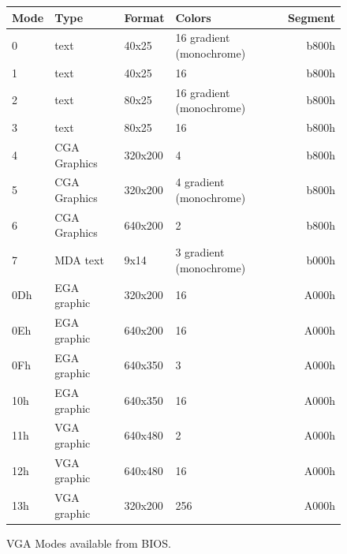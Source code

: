 \documentclass[book.tex]{subfiles}
\begin{document}
\begin{figure}[H]
\centering
\begin{table}[H]
\begin{tabularx}{\textwidth}[c]{llllr}
\hline
\textbf{Mode} & \textbf{Type} & \textbf{Format} & \textbf{Colors}          & \multicolumn{1}{l}{\textbf{Segment}} \\ \hline
0             & text          & 40x25           & 16 gradient (monochrome) & b800h                                \\ \hline
1             & text          & 40x25           & 16                       & b800h                                \\ \hline
2             & text          & 80x25           & 16 gradient (monochrome) & b800h                                \\ \hline
3             & text          & 80x25           & 16                       & b800h                                \\ \hline
4             & CGA Graphics  & 320x200         & 4                        & b800h                                \\ \hline
5             & CGA Graphics  & 320x200         & 4 gradient (monochrome)  & b800h                                \\ \hline
6             & CGA Graphics  & 640x200         & 2                        & b800h                                \\ \hline
7             & MDA text      & 9x14            & 3 gradient (monochrome)  & b000h                                \\ \hline
0Dh           & EGA graphic   & 320x200         & 16                       & A000h                                \\ \hline
0Eh           & EGA graphic   & 640x200         & 16                       & A000h                                \\ \hline
0Fh           & EGA graphic   & 640x350         & 3                        & A000h                                \\ \hline
10h           & EGA graphic   & 640x350         & 16                       & A000h                                \\ \hline
11h           & VGA graphic   & 640x480         & 2                        & A000h                                \\ \hline
12h           & VGA graphic   & 640x480         & 16                       & A000h                                \\ \hline
13h           & VGA graphic   & 320x200         & 256                      & A000h                                \\ \hline
\end{tabularx}
\end{table}
\caption{VGA Modes available from BIOS.}\label{fig:vga_modes}
 \end{figure}
 
\end{document}
